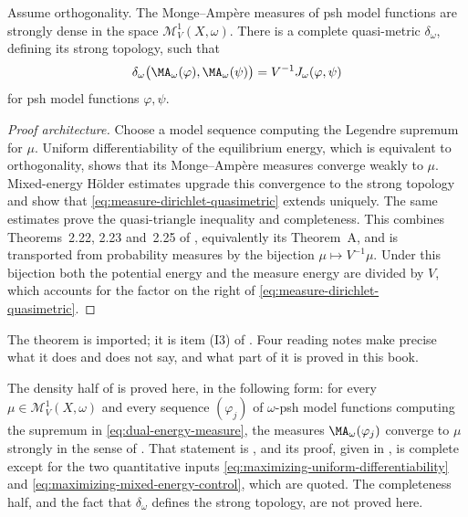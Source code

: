 \begin{theorem}
\label{thm:finite-energy-measure-completion}
Assume orthogonality.  The Monge--Amp\`ere measures of psh model functions
are strongly dense in the space $\mathcal M^1_V(X,\omega)$.  There is a
complete quasi-metric $\delta_\omega$, defining its strong topology, such
that
\begin{equation}
\label{eq:measure-dirichlet-quasimetric}
 \delta_\omega\bigl(\MA_\omega(\varphi),\MA_\omega(\psi)\bigr)
       =V^{-1}J_\omega(\varphi,\psi)
\end{equation}
for psh model functions $\varphi,\psi$.
\end{theorem}

\begin{proof}[Proof architecture]
Choose a model sequence computing the Legendre supremum for $\mu$.
Uniform differentiability of the equilibrium energy, which is equivalent to
orthogonality, shows that its Monge--Amp\`ere measures converge weakly to
$\mu$.  Mixed-energy Hölder estimates upgrade this convergence to the
strong topology and show that \eqref{eq:measure-dirichlet-quasimetric}
extends uniquely.  The same estimates prove the quasi-triangle inequality
and completeness.  This combines Theorems~2.22, 2.23 and~2.25 of
\cite{BJ25FiniteEnergy}, equivalently its Theorem~A, and is transported
from probability measures by the bijection
$\mu\mapsto V^{-1}\mu$.  Under this bijection both the potential energy and
the measure energy are divided by $V$, which accounts for the factor on the
right of \eqref{eq:measure-dirichlet-quasimetric}.
\end{proof}

The theorem is imported; it is item \textup{(I3)} of
.  Four reading notes make precise what it does and
does not say, and what part of it is proved in this book.

\begin{remark}
\label{rem:ch28-what-of-completion-is-proved}
The density half of  is proved
here, in the following form: for every $\mu\in\mathcal M^1_V(X,\omega)$
and every sequence $(\varphi_j)$ of $\omega$-psh model functions computing
the supremum in \eqref{eq:dual-energy-measure}, the measures
$\MA_\omega(\varphi_j)$ converge to $\mu$ strongly in the sense of
.  That statement is
, and its proof, given in
, is complete except for the two quantitative
inputs \eqref{eq:maximizing-uniform-differentiability} and
\eqref{eq:maximizing-mixed-energy-control}, which are quoted.  The
completeness half, and the fact that $\delta_\omega$ defines the strong
topology, are not proved here.
\end{remark}

